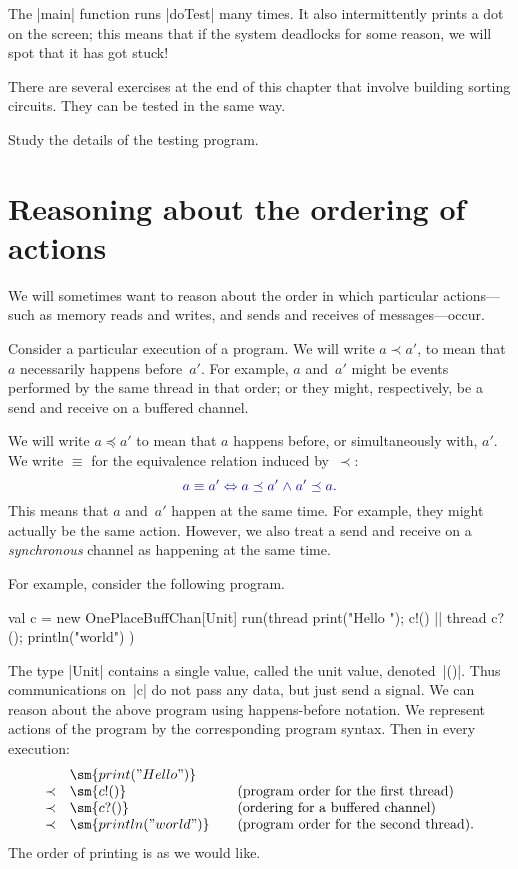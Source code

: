 The |main| function  runs |doTest| many times.
%
It also intermittently prints a dot on the screen; this means that if the
system deadlocks for some reason, we will spot that it has got stuck!

There are several exercises at the end of this chapter that involve building
sorting circuits.  They can be tested in the same way.
%
\begin{instruction}
Study the details of the testing program.
\end{instruction}


\section{Reasoning about the ordering of actions}

We will sometimes want to reason about the order in which particular
actions---such as memory reads and writes, and sends and receives of
messages---occur.

Consider a particular execution of a program.  We will write $a \prec a'$, to
mean that $a$ necessarily happens before~$a'$.  For example, $a$ and~$a'$
might be events performed by the same thread in that order; or they might,
respectively, be a send and receive on a buffered channel.

We will write $a \preceq a'$ to mean that $a$ happens before, or
simultaneously with, $a'$.  
%
We write $\equiv$ for the equivalence relation induced by~$\prec$:
\[\mstyle
a \equiv a' \iff a \preceq a' \land a' \preceq a.
\]
This means that $a$ and~$a'$ happen at the same time.  For example, they might
actually be the same action.  However, we also treat a send and receive on a
\emph{synchronous} channel as happening at the same time.

For example, consider the following program.
\begin{scala}
  val c = new OnePlaceBuffChan[Unit]
  run(thread{ print("Hello "); c!() } || thread{ c?(); println("world") })
\end{scala}
%
The type |Unit| contains a single value, called the unit value, denoted~|()|.
Thus communications on~|c| do not pass any data, but just send a signal.
%
We can reason about the above program using happens-before notation.  We
represent actions of the program by the corresponding program syntax.  Then in
every execution:
\[
\begin{array}{cl@{\qquad}l}
& \sm{print("Hello ")} \\
\prec & \sm{c!()} & \mbox{(program order for the first thread)} \\
\prec & \sm{c?()} & \mbox{(ordering for a buffered channel)} \\
\prec & \sm{println("world")} & \mbox{(program order for the second thread).}
\end{array}
\]
The order of printing is as we would like. 

